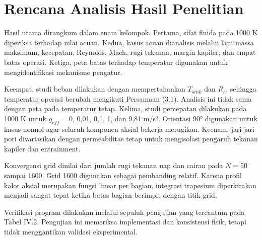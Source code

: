 \documentclass[
  12pt,a4paper,oneside]{report}
\begin{document}
\hypertarget{rencana-analisis-hasil-penelitian}{%
\section{Rencana Analisis Hasil
Penelitian}\label{rencana-analisis-hasil-penelitian}}

Hasil utama dirangkum dalam enam kelompok. Pertama, sifat fluida pada
1000 K diperiksa terhadap nilai acuan. Kedua, kasus acuan dianalisis
melalui laju massa maksimum, kecepatan, Reynolds, Mach, rugi tekanan,
margin kapiler, dan empat batas operasi. Ketiga, peta batas terhadap
temperatur digunakan untuk mengidentifikasi mekanisme pengatur.

Keempat, studi beban dilakukan dengan mempertahankan \(T_{sink}\) dan
\(R_c\), sehingga temperatur operasi berubah mengikuti Persamaan (3.1).
Analisis ini tidak sama dengan peta pada temperatur tetap. Kelima, studi
percepatan dilakukan pada 1000 K untuk \(g_{eff}=0\), 0,01, 0,1, 1, dan
9,81 m/s². Orientasi 90° digunakan untuk kasus nonnol agar seluruh
komponen aksial bekerja merugikan. Keenam, jari-jari pori divariasikan
dengan permeabilitas tetap untuk mengisolasi pengaruh tekanan kapiler
dan entrainment.

Konvergensi grid dinilai dari jumlah rugi tekanan uap dan cairan pada
\(N=50\) sampai 1600. Grid 1600 digunakan sebagai pembanding relatif.
Karena profil kalor aksial merupakan fungsi linear per bagian, integrasi
trapesium diperkirakan menjadi sangat tepat ketika batas bagian berimpit
dengan titik grid.

Verifikasi program dilakukan melalui sepuluh pengujian yang tercantum
pada Tabel IV.2. Pengujian ini memeriksa implementasi dan konsistensi
fisik, tetapi tidak menggantikan validasi eksperimental.
\end{document}
